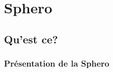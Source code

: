 \section{Sphero}
\subsection{Qu'est ce?}

\begin{frame}
 \frametitle{Présentation de la Sphero}
\end{frame}